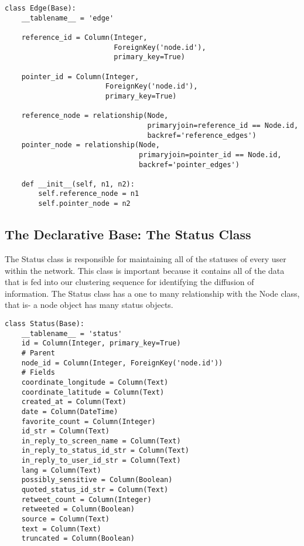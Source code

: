 \begin{lstlisting}
class Edge(Base):
    __tablename__ = 'edge'

    reference_id = Column(Integer,
                          ForeignKey('node.id'),
                          primary_key=True)

    pointer_id = Column(Integer,
                        ForeignKey('node.id'),
                        primary_key=True)

    reference_node = relationship(Node,
                                  primaryjoin=reference_id == Node.id,
                                  backref='reference_edges')
    pointer_node = relationship(Node,
                                primaryjoin=pointer_id == Node.id,
                                backref='pointer_edges')

    def __init__(self, n1, n2):
        self.reference_node = n1
        self.pointer_node = n2
\end{lstlisting}


\subsection{The Declarative Base: The  Status Class}
The Status class is responsible for maintaining all of the statuses of every user within the network. This class is important because it contains all of the data that is fed into our clustering sequence for identifying the diffusion of information. The Status class has a one to many relationship with the Node class, that is- a node object has many status objects.
\begin{lstlisting}
class Status(Base):
    __tablename__ = 'status'
    id = Column(Integer, primary_key=True)
    # Parent
    node_id = Column(Integer, ForeignKey('node.id'))
    # Fields
    coordinate_longitude = Column(Text)
    coordinate_latitude = Column(Text)
    created_at = Column(Text)
    date = Column(DateTime)
    favorite_count = Column(Integer)
    id_str = Column(Text)
    in_reply_to_screen_name = Column(Text)
    in_reply_to_status_id_str = Column(Text)
    in_reply_to_user_id_str = Column(Text)
    lang = Column(Text)
    possibly_sensitive = Column(Boolean)
    quoted_status_id_str = Column(Text)
    retweet_count = Column(Integer)
    retweeted = Column(Boolean)
    source = Column(Text)
    text = Column(Text)
    truncated = Column(Boolean)
\end{lstlisting}


